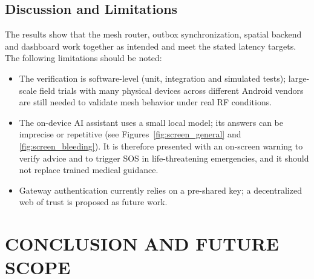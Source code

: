 \documentclass[12pt,a4paper]{report}
\begin{document}
\section{Discussion and Limitations}
The results show that the mesh router, outbox synchronization, spatial backend and dashboard work together as intended and meet the stated latency targets. The following limitations should be noted:
\begin{itemize}
    \item The verification is software-level (unit, integration and simulated tests); large-scale field trials with many physical devices across different Android vendors are still needed to validate mesh behavior under real RF conditions.
    \item The on-device AI assistant uses a small local model; its answers can be imprecise or repetitive (see Figures~\ref{fig:screen_general} and \ref{fig:screen_bleeding}). It is therefore presented with an on-screen warning to verify advice and to trigger SOS in life-threatening emergencies, and it should not replace trained medical guidance.
    \item Gateway authentication currently relies on a pre-shared key; a decentralized web of trust is proposed as future work.
\end{itemize}

\chapter{CONCLUSION AND FUTURE SCOPE}
\end{document}
